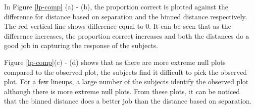 \documentclass[12]{article}
\begin{document}
In Figure \ref{lp-comp} (a) - (b), the proportion correct is plotted against the difference for distance based on separation and the binned distance respectively. The red vertical line shows difference equal to 0.  It can be seen that as the difference increases, the proportion correct increases and both the distances do a good job in capturing the response of the subjects. 

Figure \ref{lp-comp}(c) - (d) shows that as there are more extreme null plots compared to the observed plot, the subjects find it difficult to pick the observed plot. For a few lineups, a large number of the subjects identify the observed plot although there is more extreme null plots. From these plots, it can be noticed that the binned distance does a better job than the distance based on separation. 
\end{document}
